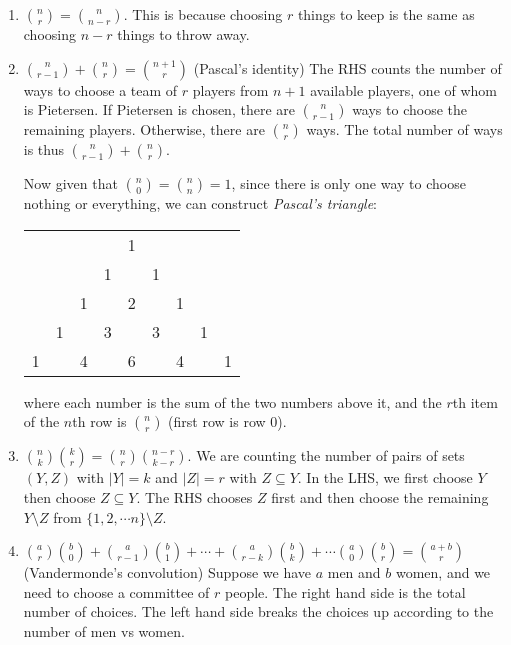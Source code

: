 \documentclass[a4paper]{article}
\begin{document}
\begin{prop}\leavevmode
  \begin{enumerate}
    \item $\displaystyle\binom{n}{r} = \binom{n}{n - r}$. This is because choosing $r$ things to keep is the same as choosing $n - r$ things to throw away.
    \item $\displaystyle\binom{n }{r - 1} + \binom{n}{r} = \binom{n + 1}{r}$ (Pascal's identity) The RHS counts the number of ways to choose a team of $r$ players from $n + 1$ available players, one of whom is Pietersen. If Pietersen is chosen, there are $\binom{n}{r - 1}$ ways to choose the remaining players. Otherwise, there are $\binom{n}{r}$ ways. The total number of ways is thus $\binom{n}{r - 1} + \binom{n}{r}$.

      Now given that $\binom{n}{0} =\binom{n}{n}= 1$, since there is only one way to choose nothing or everything, we can construct \emph{Pascal's triangle}:
      \begin{center}
        \begin{tabular}{lllllllll}
          & & & & 1 & & & & \\
          & & & 1 & & 1 & & & \\
          & & 1 & & 2 & & 1 & & \\
          & 1 & & 3 & & 3 & & 1 & \\
          1 & & 4 & & 6 & & 4 & & 1 \\
        \end{tabular}
      \end{center}
      where each number is the sum of the two numbers above it, and the $r$th item of the $n$th row is $\binom{n}{r}$ (first row is row $0$).
    \item $\displaystyle\binom{n }{k}\binom{k }{r} = \binom{n}{r}\binom{n - r}{k - r}$. We are counting the number of pairs of sets $(Y, Z)$ with $|Y| = k$ and $|Z| = r$ with $Z\subseteq Y$. In the LHS, we first choose $Y$ then choose $Z\subseteq Y$. The RHS chooses $Z$ first and then choose the remaining $Y\setminus Z$ from $\{1, 2, \cdots n\}\setminus Z$.
    \item $\displaystyle \binom{a}{r}\binom{b}{0} + \binom{a}{r - 1}\binom{b}{1} + \cdots + \binom{a }{r - k}\binom{b}{k} + \cdots \binom{a}{0}\binom{b}{r} = \binom{a + b}{r}$ (Vandermonde's convolution) Suppose we have $a$ men and $b$ women, and we need to choose a committee of $r$ people. The right hand side is the total number of choices. The left hand side breaks the choices up according to the number of men vs women.
  \end{enumerate}
\end{prop}
\end{document}
